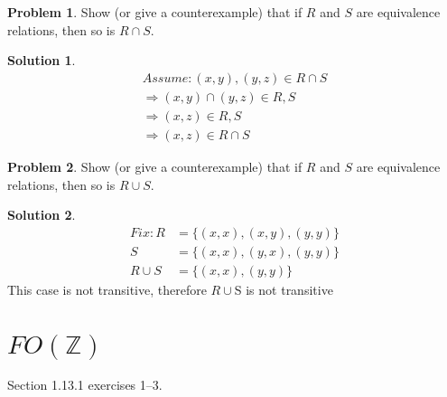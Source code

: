 \documentclass[10pt]{article}
\theoremstyle{definition}
\newtheorem{prob}{Problem}
\newtheorem{sol}{Solution}
\begin{document}
  \begin{prob}
    Show (or give a counterexample) that if $R$ and $S$ are equivalence relations, then so is $R \cap
    S$.
  \end{prob}
  
  \begin{sol}
   \begin{align}
   Assume: {(x,y),(y,z)} \in R \cap S \\
     \Rightarrow (x,y) \cap (y,z) \in R,S \\
     \Rightarrow (x,z) \in R,S \\
     \Rightarrow (x,z) \in R \cap S
   \end{align}
  \end{sol}
  
  \begin{prob}
    Show (or give a counterexample) that if $R$ and $S$ are equivalence relations, then so is
    $R \cup S$.
  \end{prob}
  
  \begin{sol}
  \begin{align}
    Fix: R &= \big\{(x,x),(x,y),(y,y)\big\} \\
    S &= \big\{(x,x),(y,x),(y,y)\big\} \\
      R \cup S  &= \big\{(x,x),(y,y)\big\}
  \end{align}
  This case is not transitive, therefore $R \cup $S is not transitive
  \end{sol}
  
  
  \section*{$FO(\mathbb Z)$}
  
  Section 1.13.1 exercises 1--3.
  
  
  
  
  
\end{document}

